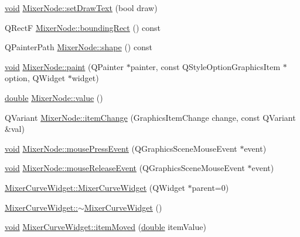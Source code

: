 \begin{DoxyCompactItemize}
\item 
\hyperlink{group___u_a_v_objects_plugin_ga444cf2ff3f0ecbe028adce838d373f5c}{void} \hyperlink{group___u_a_v_object_widget_utils_gac7a63c8df4268991b6c48f6d528fe02c}{Mixer\-Node\-::set\-Draw\-Text} (bool draw)
\item 
Q\-Rect\-F \hyperlink{group___u_a_v_object_widget_utils_ga016954be92f06c8ef2007526890e030e}{Mixer\-Node\-::bounding\-Rect} () const 
\item 
Q\-Painter\-Path \hyperlink{group___u_a_v_object_widget_utils_gafbd32275c2089c42d00f43a0e17886ae}{Mixer\-Node\-::shape} () const 
\item 
\hyperlink{group___u_a_v_objects_plugin_ga444cf2ff3f0ecbe028adce838d373f5c}{void} \hyperlink{group___u_a_v_object_widget_utils_gaa06d538612911f733082849ebbef3cb0}{Mixer\-Node\-::paint} (Q\-Painter $\ast$painter, const Q\-Style\-Option\-Graphics\-Item $\ast$option, Q\-Widget $\ast$widget)
\item 
\hyperlink{_super_l_u_support_8h_a8956b2b9f49bf918deed98379d159ca7}{double} \hyperlink{group___u_a_v_object_widget_utils_ga74c57bb80930c775e055d2759acb92fe}{Mixer\-Node\-::value} ()
\item 
Q\-Variant \hyperlink{group___u_a_v_object_widget_utils_ga4e95b04348d98dedd3493d466fb5bdf5}{Mixer\-Node\-::item\-Change} (Graphics\-Item\-Change change, const Q\-Variant \&val)
\item 
\hyperlink{group___u_a_v_objects_plugin_ga444cf2ff3f0ecbe028adce838d373f5c}{void} \hyperlink{group___u_a_v_object_widget_utils_ga5b8710657e58b224928419c431d19fbc}{Mixer\-Node\-::mouse\-Press\-Event} (Q\-Graphics\-Scene\-Mouse\-Event $\ast$event)
\item 
\hyperlink{group___u_a_v_objects_plugin_ga444cf2ff3f0ecbe028adce838d373f5c}{void} \hyperlink{group___u_a_v_object_widget_utils_ga82dc38bf127547b87931a58561f02a27}{Mixer\-Node\-::mouse\-Release\-Event} (Q\-Graphics\-Scene\-Mouse\-Event $\ast$event)
\item 
\hyperlink{group___u_a_v_object_widget_utils_gafcc28d34cf4bf00ed61926b4cbdd5a7e}{Mixer\-Curve\-Widget\-::\-Mixer\-Curve\-Widget} (Q\-Widget $\ast$parent=0)
\item 
\hyperlink{group___u_a_v_object_widget_utils_ga95ab335915408821a081b9be9b837866}{Mixer\-Curve\-Widget\-::$\sim$\-Mixer\-Curve\-Widget} ()
\item 
\hyperlink{group___u_a_v_objects_plugin_ga444cf2ff3f0ecbe028adce838d373f5c}{void} \hyperlink{group___u_a_v_object_widget_utils_ga1a7a9e06137eef080091ca11b1bf0c05}{Mixer\-Curve\-Widget\-::item\-Moved} (\hyperlink{_super_l_u_support_8h_a8956b2b9f49bf918deed98379d159ca7}{double} item\-Value)

\end{DoxyCompactItemize}
